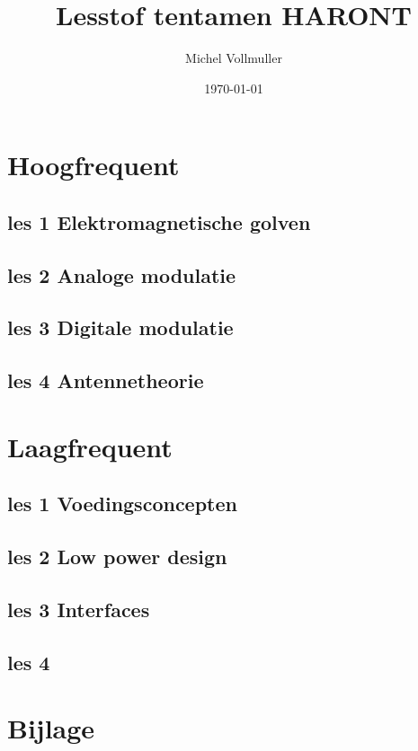 \documentclass{article}
\begin{document}
\title{Lesstof tentamen HARONT}
\author{Michel Vollmuller}
\date{\today}

\maketitle


\tableofcontents

\newpage

\section{Hoogfrequent}

    \subsection{les 1 Elektromagnetische golven}
    

    \newpage
    \subsection{les 2 Analoge modulatie}
    

    \newpage
    \subsection{les 3 Digitale modulatie}
    

    \subsection{les 4 Antennetheorie}
    

\newpage

\section{Laagfrequent}

    \subsection{les 1 Voedingsconcepten}
    

    \subsection{les 2 Low power design}
    

    \subsection{les 3 Interfaces}
    

    \subsection{les 4}
    

\newpage
\section*{Bijlage}

\end{document}
